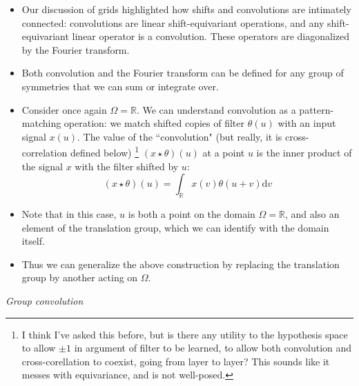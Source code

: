 \documentclass[12pt]{article}
\numberwithin{equation}{section}
\theoremstyle{definition}
\newcommand{		\n		}	{	\noindent					} %
\newcommand{		\1		}	{	\bm{1}					}%
\begin{document}
\begin{itemize}
\item Our discussion of grids highlighted how shifts and convolutions are intimately connected: convolutions are linear shift-equivariant operations, and any shift-equivariant linear operator is a convolution. These operators are diagonalized by the Fourier transform.
\item Both convolution and the Fourier transform can be defined for any group of symmetries that we can sum or integrate over. 
\item Consider once again $\Omega =\mathbb{R}$. We can understand convolution as a pattern-matching operation: we match shifted copies of filter $\theta(u)$ with an input signal $x(u)$. The value of the ``convolution" (but really, it is cross-correlation defined below) \footnote{ I think I've asked this before, but is there any utility to the hypothesis space to allow $\pm1$ in argument of filter to be learned, to allow both convolution and cross-corellation to coexist, going from layer to layer? This sounds like it messes with equivariance, and is not well-posed.  }  $(x \star \theta) (u )$ at a point $u$ is the inner product of the signal $x$ with the filter shifted by $u$:
$$
( x \star \theta ) (u ) = \int_{\mathbb{R}} x(v) \theta(u + v) \textrm{d} v 
$$
\item Note that in this case, $u$ is both a point on the domain $\Omega = \mathbb{R}$, and also an element of the translation group, which we can identify with the domain itself. 
\item Thus we can generalize the above construction by replacing the translation group by another acting on $\Omega$. 
\end{itemize}

\n\hrulefill 
\emph{ Group convolution }
\hrulefill
\end{document}
